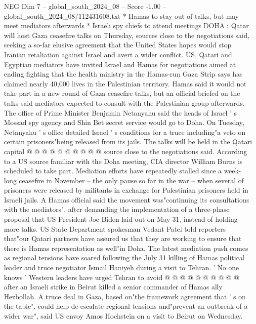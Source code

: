 \begin{textsample}{NEG Dim 7 – global\_south\_2024\_08 – Score -1.00 – global\_south\_2024\_08/112431608.txt}  \label{ex:f7_neg_275}
* Hamas to stay out of talks, but may meet mediators afterwards * Israeli spy chiefs to attend meetings DOHA : Qatar will host Gaza ceasefire talks on Thursday, sources close to the negotiations said, seeking a so-far elusive agreement that the United States hopes would stop Iranian retaliation against Israel and avert a wider conflict.
US, Qatari and Egyptian mediators have invited Israel and Hamas for negotiations aimed at ending fighting that the health ministry in the Hamas-run Gaza Strip says has claimed nearly 40,000 lives in the Palestinian territory.
Hamas said it would not take part in a new round of Gaza ceasefire talks, but an official briefed on the talks said mediators expected to consult with the Palestinian group afterwards.
The office of Prime Minister Benjamin Netanyahu said the heads of Israel ' s Mossad spy agency and Shin Bet secret service would go to Doha.
On Tuesday, Netanyahu ' s office detailed Israel ' s conditions for a truce including"a veto on certain prisoners"being released from its jails.
The talks will be held in the Qatari capital @ @ @ @ @ @ @ @ @ @ source close to the negotiations said.
According to a US source familiar with the Doha meeting, CIA director William Burns is scheduled to take part.
Mediation efforts have repeatedly stalled since a week-long ceasefire in November -- the only pause so far in the war -- when several of prisoners were released by militants in exchange for Palestinian prisoners held in Israeli jails.
A Hamas official said the movement was"continuing its consultations with the mediators", after demanding the implementation of a three-phase proposal that US President Joe Biden laid out on May 31, instead of holding more talks.
US State Department spokesman Vedant Patel told reporters that"our Qatari partners have assured us that they are working to ensure that there is Hamas representation as well"in Doha.
The latest mediation push comes as regional tensions have soared following the July 31 killing of Hamas political leader and truce negotiator Ismail Haniyeh during a visit to Tehran. ' No one knows ' Western leaders have urged Tehran to avoid @ @ @ @ @ @ @ @ @ @ after an Israeli strike in Beirut killed a senior commander of Hamas ally Hezbollah.
A truce deal in Gaza, based on"the framework agreement that ' s on the table", could help de-escalate regional tensions and"prevent an outbreak of a wider war", said US envoy Amos Hochstein on a visit to Beirut on Wednesday.

\end{textsample}
